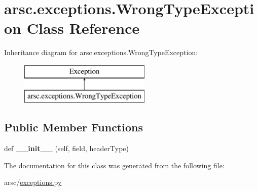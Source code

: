 \hypertarget{classarsc_1_1exceptions_1_1WrongTypeException}{}\section{arsc.\+exceptions.\+Wrong\+Type\+Exception Class Reference}
\label{classarsc_1_1exceptions_1_1WrongTypeException}
Inheritance diagram for arsc.\+exceptions.\+Wrong\+Type\+Exception\+:\begin{figure}[H]
\begin{center}
\leavevmode
\includegraphics[height=2.000000cm]{classarsc_1_1exceptions_1_1WrongTypeException}
\end{center}
\end{figure}
\subsection*{Public Member Functions}
\begin{DoxyCompactItemize}
\item 
\mbox{\label{classarsc_1_1exceptions_1_1WrongTypeException_a845a791c5e89bc7eadce30b501fbcf98}} 
def {\bfseries \+\_\+\+\_\+init\+\_\+\+\_\+} (self, field, header\+Type)
\end{DoxyCompactItemize}


The documentation for this class was generated from the following file\+:\begin{DoxyCompactItemize}
\item 
arsc/\mbox{\hyperlink{exceptions_8py}{exceptions.\+py}}\end{DoxyCompactItemize}
